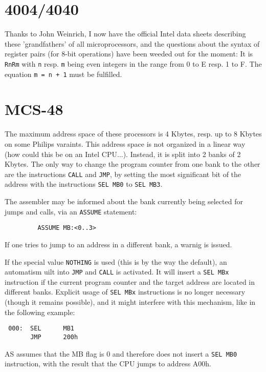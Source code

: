 \documentclass[12pt,twoside]{report}
\newcommand{\tty}[1]{{\tt #1}}
\begin{document}

\section{4004/4040}

Thanks to John Weinrich, I now have the official Intel data sheets
describing these 'grandfathers' of all microprocessors, and the questions
about the syntax of register pairs (for 8-bit operations) have been weeded
out for the moment: It is \tty{RnRm} with \tty{n} resp. \tty{m} being even
integers in the range from 0 to E resp. 1 to F.  The equation {\tt m = n +
1} must be fulfilled.


\section{MCS-48}

The maximum address space of these processors is 4 Kbytes, resp.  up to
8 Kbytes on some Philips varaints.  This address space is not organized
in a linear way (how could this be on an Intel CPU...).  Instead, it is
split into 2 banks of 2 Kbytes.  The only way to change the program
counter from one bank to the other are the instructions \tty{CALL} and
\tty{JMP}, by setting the most significant bit of the address with the
instructions \tty{SEL MB0} to \tty{SEL MB3}.

The assembler may be informed about the bank currently being selected for
jumps and calls, via an {\tt ASSUME} statement:
\begin{verbatim}
         ASSUME MB:<0..3>
\end{verbatim}
If one tries to jump to an address in a different bank, a warnig is
issued.

If the special value {\tt NOTHING} is used (this is by the way the
default), an automatism uilt into \tty{JMP} and \tty{CALL} is activated.
It will insert a {\tt SEL MBx} instruction if the current program counter
and the target address are located in different banks.  Explicit usage of
\tty{SEL MBx} instructions is no longer necessary (though it remains possible),
and it might interfere with this mechanism, like in the following example:
\begin{verbatim}
 000:  SEL      MB1
       JMP      200h
\end{verbatim}
AS assumes that the MB flag is 0 and therefore does not insert a \tty{SEL
MB0} instruction, with the result that the CPU jumps to address
A00h.
\end{document}

